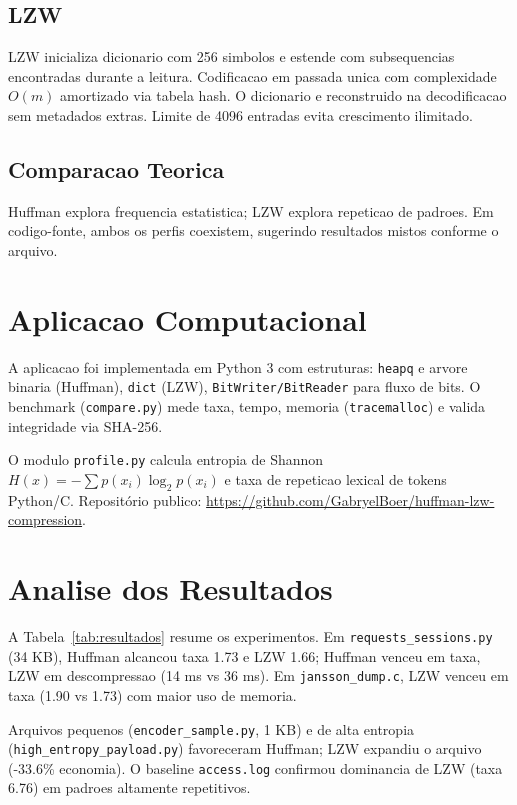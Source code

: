 \documentclass[12pt]{article}
\begin{document}
\subsection{LZW}

LZW inicializa dicionario com 256 simbolos e estende com subsequencias encontradas durante a leitura. Codificacao em passada unica com complexidade $O(m)$ amortizado via tabela hash. O dicionario e reconstruido na decodificacao sem metadados extras. Limite de 4096 entradas evita crescimento ilimitado.

\subsection{Comparacao Teorica}

Huffman explora frequencia estatistica; LZW explora repeticao de padroes. Em codigo-fonte, ambos os perfis coexistem, sugerindo resultados mistos conforme o arquivo.

\section{Aplicacao Computacional}

A aplicacao foi implementada em Python 3 com estruturas: \texttt{heapq} e arvore binaria (Huffman), \texttt{dict} (LZW), \texttt{BitWriter/BitReader} para fluxo de bits. O benchmark (\texttt{compare.py}) mede taxa, tempo, memoria (\texttt{tracemalloc}) e valida integridade via SHA-256.

O modulo \texttt{profile.py} calcula entropia de Shannon $H(x) = -\sum p(x_i) \log_2 p(x_i)$ e taxa de repeticao lexical de tokens Python/C. Repositório publico: \url{https://github.com/GabryelBoer/huffman-lzw-compression}.

\section{Analise dos Resultados}

A Tabela~\ref{tab:resultados} resume os experimentos. Em \texttt{requests\_sessions.py} (34 KB), Huffman alcancou taxa 1.73 e LZW 1.66; Huffman venceu em taxa, LZW em descompressao (14 ms vs 36 ms). Em \texttt{jansson\_dump.c}, LZW venceu em taxa (1.90 vs 1.73) com maior uso de memoria.

Arquivos pequenos (\texttt{encoder\_sample.py}, 1 KB) e de alta entropia (\texttt{high\_entropy\_payload.py}) favoreceram Huffman; LZW expandiu o arquivo (-33.6\% economia). O baseline \texttt{access.log} confirmou dominancia de LZW (taxa 6.76) em padroes altamente repetitivos.
\end{document}
